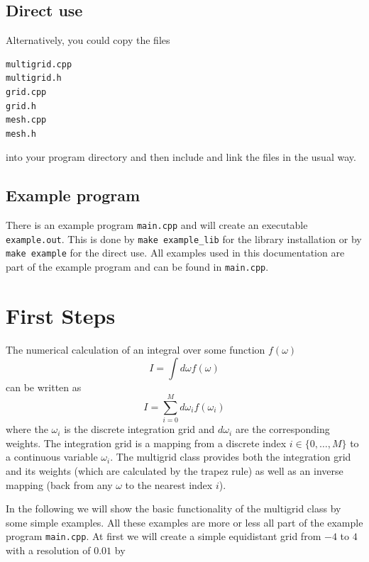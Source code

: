 \subsection{Direct use}
Alternatively, you could copy the files
\begin{lstlisting}
multigrid.cpp
multigrid.h
grid.cpp
grid.h
mesh.cpp
mesh.h
\end{lstlisting}
into your program directory and then include and link the files in the usual way. 

\subsection{Example program}
There is an example program \texttt{main.cpp} and will create an executable \texttt{example.out}. This is done by \texttt{make example\_lib} for the library installation or by \texttt{make example} for the direct use. All examples used in this documentation are part of the example program and can be found in \texttt{main.cpp}.

\section{First Steps}
The numerical calculation of an integral over some function $f(\omega)$
\begin{equation} \label{eqn:integral}
	I=\int d\omega f(\omega)
\end{equation}
can be written as
\begin{equation} \label{eqn:nintegral}
	I=\sum_{i=0}^M d\omega_i f(\omega_i)
\end{equation}
where the $\omega_i$ is the discrete integration grid and $d\omega_i$ are the corresponding weights. The integration grid is a mapping from a discrete index $i\in\{0,\dots,M\}$ to a continuous variable $\omega_i$. The multigrid class provides both the integration grid and its weights (which are calculated by the trapez rule) as well as an inverse mapping (back from any $\omega$ to the nearest index $i$).

In the following we will show the basic functionality of the multigrid class by some simple examples. All these examples are more or less all part of the example program \texttt{main.cpp}. At first we will create a simple equidistant grid from $-4$ to $4$ with a resolution of $0.01$ by 

